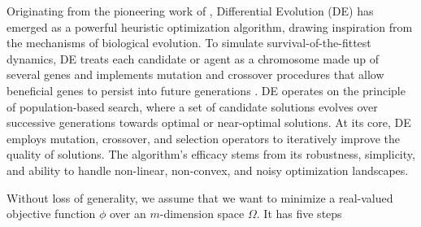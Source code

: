 \documentclass [PhD] {package/uclathes}
\begin{document}
Originating from the pioneering work of \textcite{storn1997differential}, Differential Evolution (DE) has emerged as a powerful heuristic optimization algorithm, drawing inspiration from the mechanisms of biological evolution.  To simulate survival-of-the-fittest dynamics, DE treats each candidate or agent as a chromosome made up of several genes and implements mutation and crossover procedures that allow beneficial genes to persist into future generations \parencite{storn1997differential}. DE operates on the principle of population-based search, where a set of candidate solutions evolves over successive generations towards optimal or near-optimal solutions. At its core, DE employs mutation, crossover, and selection operators to iteratively improve the quality of solutions. The algorithm's efficacy stems from its robustness, simplicity, and ability to handle non-linear, non-convex, and noisy optimization landscapes.


Without loss of generality, we assume that we want to minimize a real-valued objective function $\phi$ over an $m$-dimension space $\Omega$. It has five steps
\end{document}
